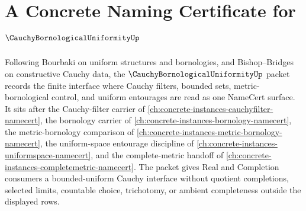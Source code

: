 \chapter{A Concrete Naming Certificate for $\CauchyBornologicalUniformityUp$}
\label{ch:concrete-instances-cauchy-bornological-uniformity-namecert}

Following Bourbaki on uniform structures and bornologies, and Bishop--Bridges on constructive Cauchy data, the $\CauchyBornologicalUniformityUp$ packet records the finite interface where Cauchy filters, bounded sets, metric-bornological control, and uniform entourages are read as one NameCert surface. It sits after the Cauchy-filter carrier of \autoref{ch:concrete-instances-cauchyfilter-namecert}, the bornology carrier of \autoref{ch:concrete-instances-bornology-namecert}, the metric-bornology comparison of \autoref{ch:concrete-instances-metric-bornology-namecert}, the uniform-space entourage discipline of \autoref{ch:concrete-instances-uniformspace-namecert}, and the complete-metric handoff of \autoref{ch:concrete-instances-completemetric-namecert}. The packet gives Real and Completion consumers a bounded-uniform Cauchy interface without quotient completions, selected limits, countable choice, trichotomy, or ambient completeness outside the displayed rows.

